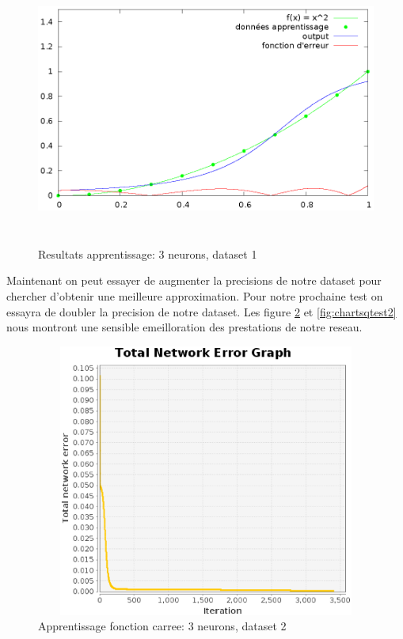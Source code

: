 \documentclass[twoside,openright,a4paper,11pt,french]{article}
\begin{document}
\begin{figure}[ht]
\centering
\includegraphics[width=12cm,height=9cm]{./pics/chartsqtest1.eps}
\caption{Resultats apprentissage: 3 neurons, dataset 1}
\label{fig:chartsqtest1}
\end{figure}

Maintenant on peut essayer de augmenter la precisions de notre dataset
pour chercher d'obtenir une meilleure approximation. Pour notre 
prochaine test on essayra de doubler la precision de notre dataset.
Les figure \ref{fig:sqtest2} et \ref{fig:chartsqtest2} nous montront une sensible 
emeilloration des prestations de notre reseau. 



\begin{figure}[ht]
\centering
\includegraphics[width=12cm,height=9cm]{./pics/sqtest2.eps}
\caption{Apprentissage fonction carree: 3 neurons, dataset 2}
\label{fig:sqtest2}
\end{figure}
\end{document}
